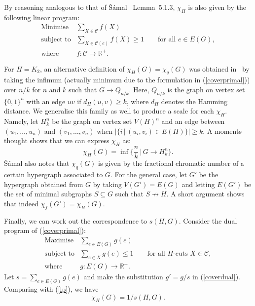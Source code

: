 \documentclass[11pt,a4paper]{article}
\begin{document}
By reasoning analogous to that of \v{S}\'{a}mal~\cite{samal:06} Lemma~5.1.3, $\chi_H$ is also
given by the following linear program:
\begin{equation} \label{coverprimal}
\begin{array}{ll}
            \text{Minimise}   & \sum_{X \in \mathcal{C}} f(X) \\
            \text{subject to} & \sum_{X \in \mathcal{C}(e)} f(X) \geq 1 \qquad \text{for all $e \in E(G)$}, \\ \text{where}      & f : {\mathcal C} \rightarrow \mathbb{R}^+.
\end{array}
\end{equation}

For $H = K_2$, an alternative definition of $\chi_H(G) = \chi_q(G)$ was
obtained in~\cite{samal:06} by taking the infimum 
(actually minimum due to the formulation in (\ref{coverprimal}))
over $n/k$ for $n$ and $k$ such that $G \rightarrow Q_{n/k}$.
Here, $Q_{n/k}$ is the graph on vertex set $\{0,1\}^n$ with
an edge $u v$ if $d_H(u,v) \geq k$, where $d_H$ denotes the
Hamming distance.
We generalise this family as well to produce a scale for each $\chi_H$.
Namely, let $H^n_k$ be the graph on vertex set $V(H)^n$ and an edge
between $(u_1, \ldots, u_n)$ and $(v_1, \ldots, v_n)$ when
$|\{ i \,|\, (u_i, v_i) \in E(H) \}| \geq k$.
A moments thought shows that we can express $\chi_H$ as:
\begin{equation}
\chi_H(G) = \inf \{ \frac{n}{k} \,|\, G \rightarrow H^n_{k} \}.
\end{equation}
\v{S}\'{a}mal also notes that $\chi_q(G)$ is given by the fractional chromatic number
of a certain hypergraph associated to $G$.
For the general case, let $G'$ be the hypergraph obtained from $G$ by taking
$V(G') = E(G)$ and letting $E(G')$ be the set of minimal subgraphs 
$S \subseteq G$ such that $S \not\rightarrow H$.
A short argument shows that indeed $\chi_f(G') = \chi_H(G)$.

Finally, we can work out the correspondence to $s(H,G)$.
Consider the dual program of (\ref{coverprimal}):
\begin{equation} \label{coverdual}
\begin{array}{ll}
            \text{Maximise}   & \sum_{e \in E(G)} g(e) \\
            \text{subject to} & \sum_{e \in X} g(e) \leq 1 \qquad \text{for all $H$-cuts $X \in \mathcal{C}$}, \\ \text{where}      & g : E(G) \rightarrow \mathbb{R}^+.
\end{array}
\end{equation}
Let $s = \sum_{e \in E(G)} g(e)$ and make the substitution $g' = g/s$ in 
(\ref{coverdual}).
Comparing with (\ref{lp}), we have
\begin{equation}
  \chi_H(G) = 1/s(H,G).
\end{equation}
\end{document}
